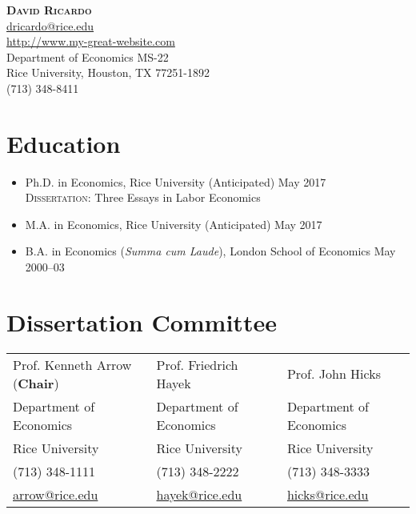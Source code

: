 \documentclass{article}[12]
\makeatletter
\newcommand{\email}[1]{\href{mailto:#1}{#1}}
\newcommand{\forceindent}{\leavevmode{\parindent=24pt\indent}}
\newcommand{\myname}{David Ricardo}
\newcommand{\myemail}{dricardo@rice.edu}
\newcommand{\mywebsite}{http://www.my-great-website.com}
\newcommand{\myphone}{(713) 348-8411}
\newcommand{\myaddress}{Department of Economics MS-22 \\ 
Rice University, Houston, TX 77251-1892}
\makeatother
\begin{document}
\thispagestyle{empty}

\begin{center}
{\bfseries\Large\scshape \myname} \\[4pt]
\email{\myemail} \\ \url{\mywebsite} \\ \myaddress \\ \myphone
\end{center}
 
\vspace{-0.5cm} 


\section{Education}

\begin{itemize}
    \item Ph.D. in Economics, Rice University  \hfill (Anticipated) May 2017  \\
    \forceindent \textsc{Dissertation}: Three Essays in Labor Economics 

    \item M.A. in Economics, Rice University  \hfill (Anticipated) May 2017 

    \item B.A. in Economics (\emph{Summa cum Laude}), London School of Economics \hfill May 2000--03 
\end{itemize}

\section{Dissertation Committee}

\begin{tabularx}{\textwidth}{@{}XXX@{}}
Prof. Kenneth Arrow (\textbf{Chair}) & Prof. Friedrich Hayek   & Prof. John Hicks        \\
Department of Economics              & Department of Economics & Department of Economics \\
Rice University                      & Rice University         & Rice University         \\
(713) 348-1111                       & (713) 348-2222          & (713) 348-3333          \\
\email{arrow@rice.edu}               & \email{hayek@rice.edu}  & \email{hicks@rice.edu}
\end{tabularx}
\end{document}
